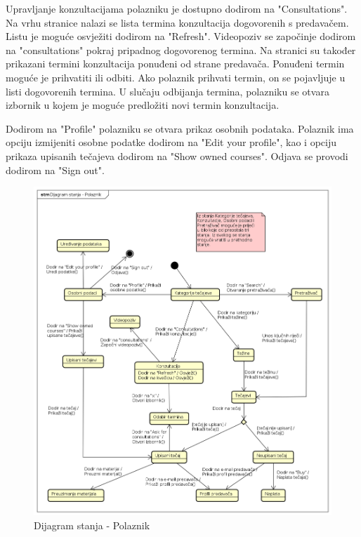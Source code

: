 			Upravljanje konzultacijama polazniku je dostupno dodirom na "Consultations". Na vrhu stranice nalazi se lista termina konzultacija dogovorenih s predavačem. Listu je moguće osvježiti dodirom na "Refresh". Videopoziv se započinje dodirom na "consultations" pokraj pripadnog dogovorenog termina. Na stranici su također prikazani termini konzultacija ponuđeni od strane predavača. Ponuđeni termin moguće je prihvatiti ili odbiti. Ako polaznik prihvati termin, on se pojavljuje u listi dogovorenih termina. U slučaju odbijanja termina, polazniku se otvara izbornik u kojem je moguće predložiti novi termin konzultacija.
			
			Dodirom na "Profile" polazniku se otvara prikaz osobnih podataka. Polaznik ima opciju izmijeniti osobne podatke dodirom na "Edit your profile", kao i opciju prikaza upisanih tečajeva dodirom na "Show owned courses". Odjava se provodi dodirom na "Sign out".
			
			\eject
			
			\begin{figure}[h]
				\includegraphics[scale=0.5]{dijagrami/Dijagram_stanja.PNG}
				\centering
				\caption{Dijagram stanja - Polaznik}
				\label{fig:Dijagram_stanja}
			\end{figure}
		
